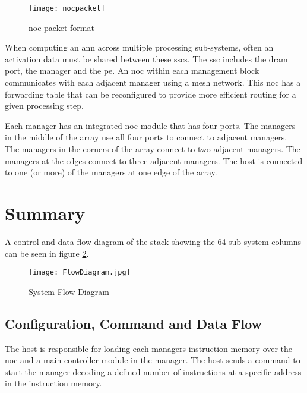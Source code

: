 \begin{figure}[!t]
\centering
\captionsetup{justification=centering}
\captionsetup{width=.9\linewidth}
\centerline{
\mbox{\texttt{[image: nocpacket]}}
}
\vspace{-10pt}
\caption{\ac{noc} packet format}
\label{fig:NoC packet format}
\end{figure}


When computing an \ac{ann} across multiple processing sub-systems, often \ac{an} activation data must be shared between these \ac{ssc}s. The \ac{ssc} includes the \ac{dram} port, the manager and the \ac{pe}. 
An \ac{noc} within each management block communicates with each adjacent manager using a mesh network. This \ac{noc} has a forwarding table that can be reconfigured to provide more efficient routing for a given processing step.

Each manager has an integrated \ac{noc} module that has four ports. 
The managers in the middle of the array use all four ports to connect to adjacent managers.
The managers in the corners of the array connect to two adjacent managers.
The managers at the edges connect to three adjacent managers.
The host is connected to one (or more) of the managers at one edge of the array. 

\section{Summary}
\label{sec:Overview Summary}

A control and data flow diagram of the stack showing the 64 sub-system columns can be seen in figure \ref{fig:FlowDiagram}.
\begin{figure}[!t]
\centering
\captionsetup{justification=centering}
\centerline{
\mbox{\texttt{[image: FlowDiagram.jpg]}}
}
\caption{System Flow Diagram}
\label{fig:FlowDiagram}
\end{figure}

\subsection{Configuration, Command and Data Flow}
\label{sec:Configuration, Command and Data Flow}

The host is responsible for loading each managers instruction memory over the \ac{noc} and a main controller module in the manager.
The host sends a command to start the manager decoding a defined number of instructions at a specific address in the instruction memory.


